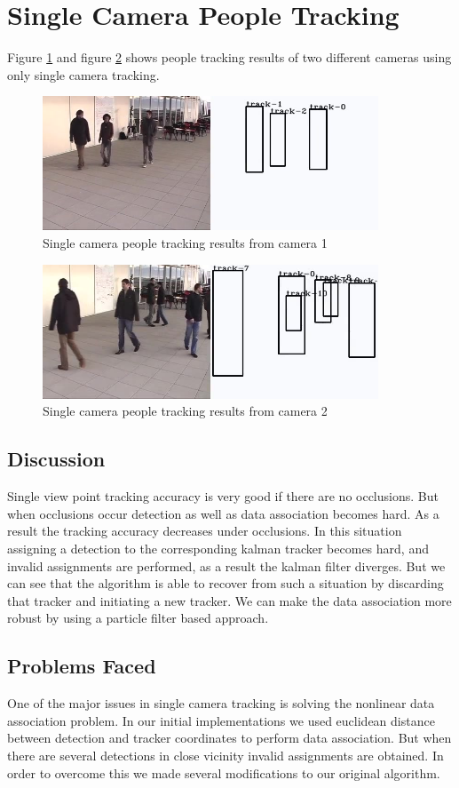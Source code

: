 \documentclass[12pt,a4paper]{report}
\begin{document}
\section{Single Camera People Tracking}
Figure \ref{cam1} and figure \ref{cam2} shows people tracking results of two different cameras using only single camera tracking.
 \begin{figure}[H]
\includegraphics[width=10cm]{cam1.jpg}
\centering
\caption{Single camera people tracking results from camera 1}
\label{cam1}
\end{figure}
 \begin{figure}[H]
\includegraphics[width=10cm]{cam2.jpg}
\centering
\caption{Single camera people tracking results from camera 2}
\label{cam2}
\end{figure}
\subsection{Discussion}
Single view point tracking accuracy is very good if there are no occlusions. But when occlusions occur detection as well as data association becomes hard. As a result the tracking accuracy decreases under occlusions. In this situation assigning a detection to the corresponding kalman tracker becomes hard, and invalid assignments are performed, as a result the kalman filter diverges. But we can see that the algorithm is able to recover from such a situation by discarding that tracker and initiating a new tracker. We can make the data association more robust by using a particle filter based approach.

\subsection{Problems Faced}
One of the major issues in single camera tracking is solving the nonlinear data association problem. In our initial implementations we used euclidean distance between detection and tracker coordinates to perform data association. But when there are several detections in close vicinity invalid assignments are obtained. In order to overcome this we made several modifications to our original algorithm. 
\end{document}
